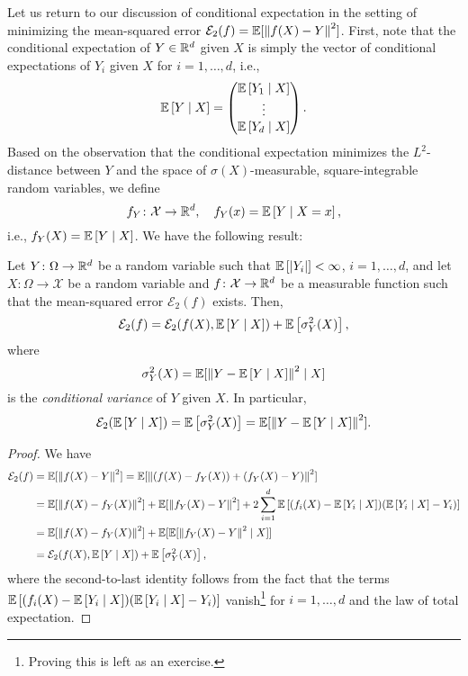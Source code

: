 Let us return to our discussion of conditional expectation in the setting of minimizing the mean-squared error $\mathcal{E}_2(f) = \mathbb{E}[\norm{f(X) - Y}^2]$. First, note that the conditional expectation of $Y \in \mathbb{R}^d$ given $X$ is simply the vector of conditional expectations of $Y_i$ given $X$ for $i = 1, \dots, d$, i.e.,
\[
    \mathbb{E}\left[Y \mathrel{|} X\right] = \begin{pmatrix}
        \mathbb{E}\left[Y_1 \mathrel{|} X\right] \\
        \vdots \\
        \mathbb{E}\left[Y_d \mathrel{|} X\right]
    \end{pmatrix}.
\]
Based on the observation that the conditional expectation minimizes the $L^2$-distance between $Y$ and the space of $\sigma(X)$-measurable, square-integrable random variables, we define
\[
    f_Y \colon \mathcal{X} \to \mathbb{R}^d, \quad f_Y(x) = \mathbb{E}\left[Y \mathrel{|} X = x\right],
\]
i.e., $f_Y(X) = \mathbb{E}\left[Y \mathrel{|} X\right]$. We have the following result:
\begin{proposition}
\label{prop: decomposition of mean-squared error}
Let $Y \colon \Omega \to \mathbb{R}^d$ be a random variable such that $\mathbb{E}\left[\abs{Y_i}\right] < \infty$, $i = 1, \dots, d$, and let $X \colon \Omega \to \mathcal{X}$ be a random variable and $f \colon \mathcal{X} \to \mathbb{R}^d$ be a measurable function such that the mean-squared error $\mathcal{E}_2(f)$ exists. Then,
\[
    \mathcal{E}_2(f) = \mathcal{E}_2(f(X), \mathbb{E}\left[Y \mathrel{|} X\right]) + \mathbb{E}\left[\sigma_Y^2(X)\right],
\]
where
\[
    \sigma_Y^2(X) = \mathbb{E}[\norm{Y - \mathbb{E}\left[Y \mathrel{|} X\right]}^2 \mathrel{|} X]
\]
is the \emph{conditional variance} of $Y$ given $X$. In particular,
\[
    \mathcal{E}_2(\mathbb{E}\left[Y \mathrel{|} X\right]) = \mathbb{E}\left[\sigma_Y^2(X)\right] = \mathbb{E}[\norm{Y - \mathbb{E}\left[Y \mathrel{|} X\right]}^2].
\]
\end{proposition}

\begin{proof}
We have
\begin{align*}
    \mathcal{E}_2(f) &= \mathbb{E}[\norm{f(X) - Y}^2] = \mathbb{E}[\norm{(f(X) - f_Y(X)) + (f_Y(X) - Y)}^2] \\
        &= \mathbb{E}[\norm{f(X) - f_Y(X)}^2] + \mathbb{E}[\norm{f_Y(X) - Y}^2] + 2 \sum_{i=1}^d \mathbb{E}\left[(f_i(X) - \mathbb{E}\left[Y_i \mathrel{|} X\right]) (\mathbb{E}\left[Y_i \mathrel{|} X\right] - Y_i)\right] \\
        &= \mathbb{E}[\norm{f(X) - f_Y(X)}^2] + \mathbb{E}[\mathbb{E}[\norm{f_Y(X) - Y}^2 \mathrel{|} X]] \\[4pt]
        &= \mathcal{E}_2(f(X), \mathbb{E}\left[Y \mathrel{|} X\right]) + \mathbb{E}\left[\sigma_Y^2(X)\right],
\end{align*}
where the second-to-last identity follows from the fact that the terms $\mathbb{E}\left[(f_i(X) - \mathbb{E}\left[Y_i \mathrel{|} X\right]) (\mathbb{E}\left[Y_i \mathrel{|} X\right] - Y_i)\right]$ vanish\footnote{Proving this is left as an exercise.} for $i = 1, \dots, d$ and the law of total expectation.
\end{proof}

